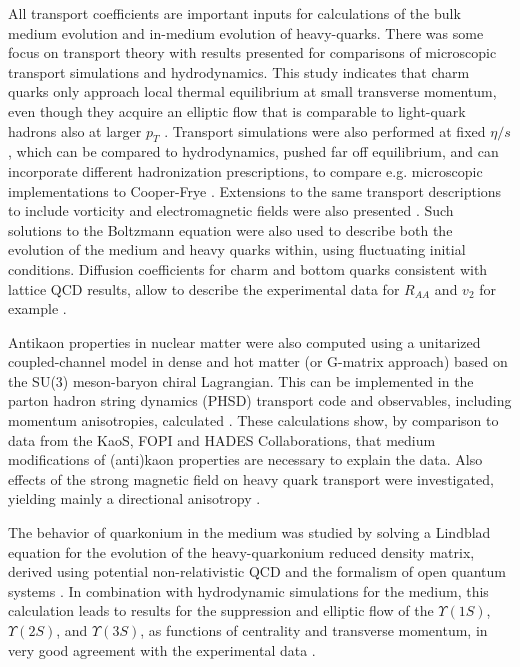 \documentclass{webofc}
\begin{document}
All transport coefficients are important inputs for calculations of the bulk medium evolution and in-medium evolution of heavy-quarks. There was some focus on transport theory with results presented for comparisons of microscopic transport simulations and hydrodynamics. This study indicates that charm quarks only approach local thermal equilibrium at small transverse momentum, even though they acquire an elliptic flow that is comparable to light-quark hadrons also at larger $p_T$ \cite{Ding:2021ajz}.
Transport simulations were also performed at fixed $\eta/s$, which can be compared to hydrodynamics, pushed far off equilibrium, and can incorporate different hadronization prescriptions, to compare e.g. microscopic implementations to Cooper-Frye \cite{galesi}. Extensions to the same transport descriptions to include vorticity and electromagnetic fields were also presented \cite{plumari}. Such solutions to the Boltzmann equation were also used to describe both the evolution of the medium and heavy quarks within, using fluctuating initial conditions. Diffusion coefficients for charm and bottom quarks consistent with lattice QCD results, allow to describe the experimental data for $R_{AA}$ and $v_2$ for example \cite{sambataro}.

Antikaon properties in nuclear matter were also computed using a unitarized coupled-channel model in dense and hot matter (or G-matrix approach) based on the SU(3) meson-baryon chiral Lagrangian. This can be implemented in the parton hadron string dynamics (PHSD) transport code and observables, including momentum anisotropies, calculated \cite{Song:2020clw}. These calculations show, by comparison to data from the KaoS, FOPI and HADES Collaborations, that medium modifications of (anti)kaon properties are necessary to explain the data. Also effects of the strong magnetic field on heavy quark transport were investigated, yielding mainly a directional anisotropy \cite{kurian}. 

The behavior of quarkonium in the medium was studied by solving a Lindblad equation for the evolution of the heavy-quarkonium reduced density matrix, derived using potential non-relativistic QCD and the formalism of open quantum systems \cite{delorme, Brambilla:2021wkt}. In combination with hydrodynamic simulations for the medium, this calculation leads to results for the suppression and elliptic flow of the $\Upsilon(1S)$, $\Upsilon(2S)$, and $\Upsilon(3S)$, as functions of centrality and transverse momentum, in very good agreement with the experimental data \cite{Brambilla:2021wkt}.
\end{document}
